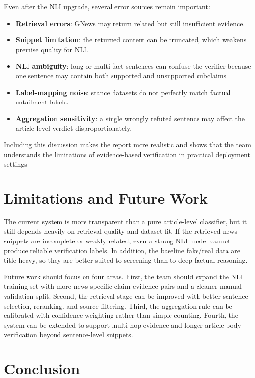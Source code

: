 \documentclass[11pt]{article}
\begin{document}
Even after the NLI upgrade, several error sources remain important:

\begin{itemize}
    \item \textbf{Retrieval errors}: GNews may return related but still insufficient evidence.
    \item \textbf{Snippet limitation}: the returned content can be truncated, which weakens premise quality for NLI.
    \item \textbf{NLI ambiguity}: long or multi-fact sentences can confuse the verifier because one sentence may contain both supported and unsupported subclaims.
    \item \textbf{Label-mapping noise}: stance datasets do not perfectly match factual entailment labels.
    \item \textbf{Aggregation sensitivity}: a single wrongly refuted sentence may affect the article-level verdict disproportionately.
\end{itemize}

Including this discussion makes the report more realistic and shows that the
team understands the limitations of evidence-based verification in practical
deployment settings.

\section{Limitations and Future Work}

The current system is more transparent than a pure article-level classifier, but
it still depends heavily on retrieval quality and dataset fit. If the retrieved
news snippets are incomplete or weakly related, even a strong NLI model cannot
produce reliable verification labels. In addition, the baseline fake/real data
are title-heavy, so they are better suited to screening than to deep factual
reasoning.

Future work should focus on four areas. First, the team should expand the NLI
training set with more news-specific claim-evidence pairs and a cleaner manual
validation split. Second, the retrieval stage can be improved with better
sentence selection, reranking, and source filtering. Third, the aggregation rule
can be calibrated with confidence weighting rather than simple counting. Fourth,
the system can be extended to support multi-hop evidence and longer article-body
verification beyond sentence-level snippets.

\section{Conclusion}
\end{document}
